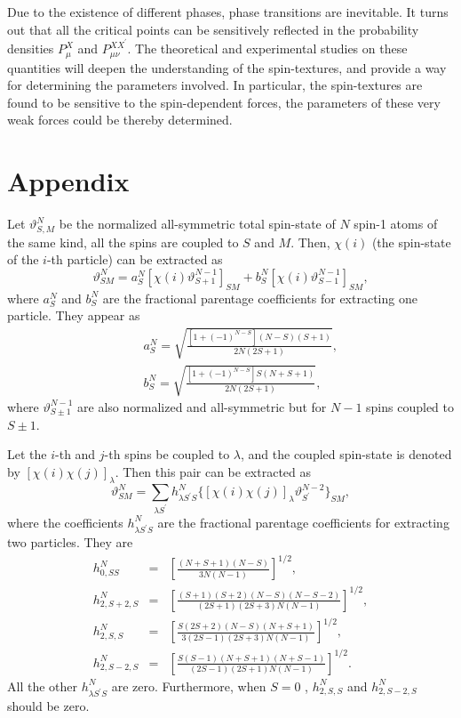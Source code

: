 \documentclass[10pt]{wlscirep}
\begin{document}
Due to the existence of different phases, phase transitions are inevitable.
It turns out that all the critical points can be sensitively reflected in
the probability densities $P_{\mu}^X$ and $P_{\mu\nu}^{XX^{\prime }}$. The
theoretical and experimental studies on these quantities will deepen the
understanding of the spin-textures, and provide a way for determining the
parameters involved. In particular, the spin-textures are found to be
sensitive to the spin-dependent forces, the parameters of these very weak
forces could be thereby determined.



\section*{Appendix}

Let $\vartheta_{S,M}^N$ be the normalized all-symmetric total spin-state of $%
N$ spin-1 atoms of the same kind, all the spins are coupled to $S$ and $M$.
Then, $\chi(i)$ (the spin-state of the $i$-th particle) can be extracted as%
\cite{bao05,bao06}
\begin{equation}
\vartheta_{SM}^N = a_S^N [\chi(i)\vartheta_{S+1}^{N-1}]_{SM} +b_S^N [\chi
(i)\vartheta_{S-1}^{N-1}]_{SM},  \label{fpc}
\end{equation}
where $a_S^N$ and $b_S^N$ are the fractional parentage coefficients for
extracting one particle. They appear as
\begin{eqnarray}
&&a_S^N=\sqrt{\frac{[1+(-1)^{N-S}](N-S)(S+1)}{2N(2S+1)}},  \nonumber \\
&&b_S^N=\sqrt{\frac{[1+(-1)^{N-S}]S(N+S+1)}{2N(2S+1)}},  \label{ab}
\end{eqnarray}
where $\vartheta_{S\pm 1}^{N-1}$ are also normalized and all-symmetric but
for $N-1$ spins coupled to $S\pm 1$.

Let the $i$-th and $j$-th spins be coupled to $\lambda$, and the coupled
spin-state is denoted by $[\chi(i)\chi(j)]_{\lambda}$. Then this pair can be
extracted as
\begin{equation}
\vartheta_{SM}^N = \sum_{\lambda S^{\prime }} h_{\lambda S^{\prime }S}^N \{
[\chi(i)\chi(j)]_{\lambda }\vartheta_{S^{\prime }}^{N-2} \}_{SM},
\label{tswf}
\end{equation}
where the coefficients $h_{\lambda S^{\prime }S}^N$ are the fractional
parentage coefficients for extracting two particles. They are
\begin{eqnarray}
h_{0,SS}^N &=&[\frac{(N+S+1)(N-S)}{3N(N-1)}]^{1/2},  \nonumber \\
h_{2,S+2,S}^N &=&[\frac{(S+1)(S+2)(N-S)(N-S-2)}{(2S+1)(2S+3)N(N-1)}]^{1/2},
\nonumber \\
h_{2,S,S}^N &=&[\frac{S(2S+2)(N-S)(N+S+1)}{3(2S-1)(2S+3)N(N-1)}]^{1/2},
\nonumber \\
h_{2,S-2,S}^N &=&[\frac{S(S-1)(N+S+1)(N+S-1)}{(2S-1)(2S+1)N(N-1)}]^{1/2}.
\label{h2}
\end{eqnarray}
All the other $h_{\lambda S^{\prime }S}^N$ are zero. Furthermore, when $S=0$%
, $h_{2,S,S}^N$ and $h_{2,S-2,S}^N$ should be zero.
\end{document}
